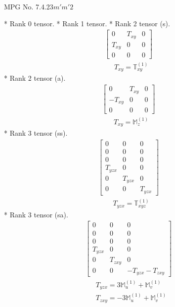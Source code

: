 \documentclass[fleqn,8pt,landscape]{jsarticle}
\begin{document}
\setcounter{MaxMatrixCols}{32}

\renewcommand{\tablename}{Table~}
\renewcommand{\figurename}{Figure~}
\begin{center}
\LARGE
MPG No. 7.4.23\quad$m'm'2$
\end{center}
* Rank 0 tensor.
* Rank 1 tensor.
* Rank 2 tensor (s).
\begin{align*}
\begin{bmatrix} 0 & T_{xy} & 0 \\ T_{xy} & 0 & 0 \\ 0 & 0 & 0 \end{bmatrix}
\end{align*}
\begin{align*}
& T_{xy} = \mathbb{T}_{xy}^{(1)}
\end{align*}
* Rank 2 tensor (a).
\begin{align*}
\begin{bmatrix} 0 & T_{xy} & 0 \\ - T_{xy} & 0 & 0 \\ 0 & 0 & 0 \end{bmatrix}
\end{align*}
\begin{align*}
& T_{xy} = \mathbb{M}_{z}^{(1)}
\end{align*}
* Rank 3 tensor (ss).
\begin{align*}
\begin{bmatrix} 0 & 0 & 0 \\ 0 & 0 & 0 \\ 0 & 0 & 0 \\ T_{yzx} & 0 & 0 \\ 0 & T_{yzx} & 0 \\ 0 & 0 & T_{yzx} \end{bmatrix}
\end{align*}
\begin{align*}
& T_{yzx} = \mathbb{T}_{xyz}^{(1)}
\end{align*}
* Rank 3 tensor (sa).
\begin{align*}
\begin{bmatrix} 0 & 0 & 0 \\ 0 & 0 & 0 \\ 0 & 0 & 0 \\ T_{yzx} & 0 & 0 \\ 0 & T_{zxy} & 0 \\ 0 & 0 & - T_{yzx} - T_{zxy} \end{bmatrix}
\end{align*}
\begin{align*}
& T_{yzx} = 3 \mathbb{M}_{u}^{(1)} + \mathbb{M}_{v}^{(1)} \\
& T_{zxy} = - 3 \mathbb{M}_{u}^{(1)} + \mathbb{M}_{v}^{(1)}
\end{align*}
\end{document}
